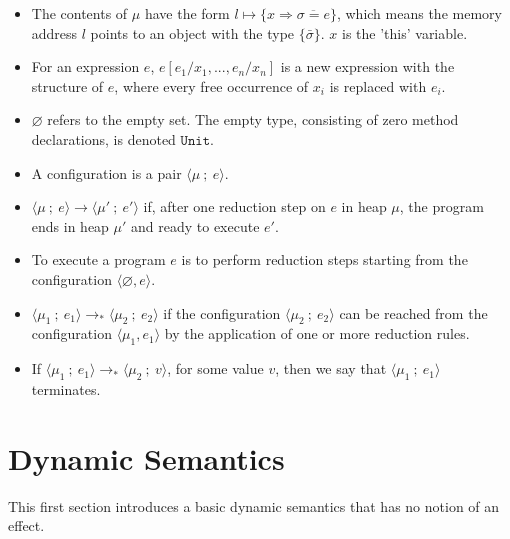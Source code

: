 \documentclass{llncs}
\newcommand{\keywadj}[1]{\mathtt{#1}}
\newcommand{\config}[1] { \langle #1 \rangle }
\begin{document}
\begin{itemize}
	\item The contents of $\mu$ have the form $l \mapsto \{ x \Rightarrow \overline{\sigma = e}\}$, which means the memory address $l$ points to an object with the type $\{ \bar \sigma \}$. $x$ is the 'this' variable.
	\item For an expression $e$, $e[e_1/x_1, ..., e_n/x_n]$ is a new expression with the structure of $e$, where every free occurrence of $x_i$ is replaced with $e_i$.
	\item $\varnothing$ refers to the empty set. The empty type, consisting of zero method declarations, is denoted $\keywadj{Unit}$.
	\item A configuration is a pair $\config{\mu~;~ e}$.
	\item $\config{\mu~;~e} \longrightarrow \config{\mu'~;~e'}$ if, after one reduction step on $e$ in heap $\mu$, the program ends in heap $\mu'$ and ready to execute $e'$.
	\item To execute a program $e$ is to perform reduction steps starting from the configuration $\config{\varnothing, e}$.
	\item $\config{\mu_1~;~e_1} \longrightarrow_* \config{\mu_2~;~e_2}$ if the configuration $\config{\mu_2~;~e_2}$ can be reached from the configuration $\config{\mu_1, e_1}$ by the application of one or more reduction rules.
	\item If $\config{\mu_1~;~e_1} \longrightarrow_* \config{\mu_2~;~v}$, for some value $v$, then we say that $\config{\mu_1~;~e_1}$ terminates.
\end{itemize}

\section{Dynamic Semantics}

This first section introduces a basic dynamic semantics that has no notion of an effect.
\\

\fbox{$\config{\mu, e} \longrightarrow \config{\mu, e}$}
\end{document}
